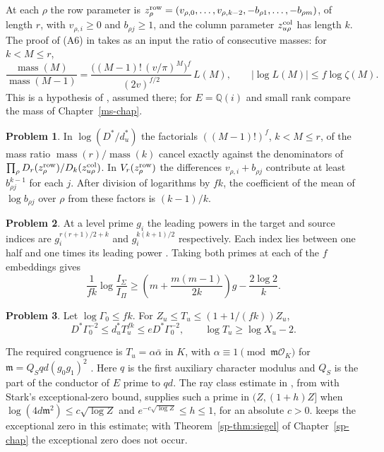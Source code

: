 \documentclass[reqno]{amsart}
\newcounter{chap}
\theoremstyle{definition}
\newtheorem{problem}{Problem}[section]
\theoremstyle{plain}
\newcommand{\mass}{\operatorname{mass}}
\newcommand{\Q}{\mathbb{Q}}
\begin{document}
At each $\rho$ the row parameter is
$z^{\rm row}_\rho=(v_{\rho,0},\dots,v_{\rho,k-2},-b_{\rho 1},\dots,-b_{\rho m})$,
of length $r$, with $v_{\rho,i}\ge0$ and $b_{\rho j}\ge1$, and the column
parameter $z^{\rm col}_{u\rho}$ has length $k$.  The proof of (A6) in
\cite[Prop.~15.25]{Adr} takes as an input the ratio of consecutive masses:
for $k<M\le r$,
\[
 \frac{\mass(M)}{\mass(M-1)}=\frac{\bigl((M-1)!\,(v/\pi)^M\bigr)^f}{(2v)^{f/2}}\,L(M),
 \qquad |\log L(M)|\le f\log\zeta(M).
\]
This is a hypothesis of \cite[Prop.~15.25]{Adr}, assumed there; for
$E=\Q(i)$ and small rank compare the mass of Chapter~\ref{ms-chap}.

\begin{problem}\label{pr:factorials}
In $\log(D^*/d_u^*)$ the factorials $((M-1)!)^f$, $k<M\le r$, of the mass
ratio $\mass(r)/\mass(k)$ cancel exactly against the denominators of
$\prod_\rho D_r(z^{\rm row}_\rho)/D_k(z^{\rm col}_{u\rho})$.  In
$V_r(z^{\rm row}_\rho)$ the differences $v_{\rho,i}+b_{\rho j}$ contribute at
least $b_{\rho j}^{k-1}$ for each $j$.  After division of logarithms by $fk$,
the coefficient of the mean of $\log b_{\rho j}$ over $\rho$ from these factors
is $(k-1)/k$.
\end{problem}

\begin{problem}\label{pr:indices}
At a level prime $g_i$ the leading powers in the target and source
indices are $g_i^{r(r+1)/2+k}$ and $g_i^{k(k+1)/2}$ respectively.
Each index lies between one half and one times its leading power
\cite[Lemma~15.21]{Adr}.  Taking both primes at each of the $f$
embeddings gives
\[
 \frac1{fk}\log\frac{I_\Sigma}{I_\Pi}
 \ge \left(m+\frac{m(m-1)}{2k}\right)g-\frac{2\log2}{k}.
\]
\end{problem}

\begin{problem}\label{pr:interval}
Let $\log\Gamma_0\le fk$.  For $Z_u\le T_u\le(1+1/(fk))Z_u$,
\[
 D^*\Gamma_0^{-2}\le d_u^* T_u^{fk}\le e D^*\Gamma_0^{-2},
 \qquad \log T_u\ge\log X_u-2 .
\]
\end{problem}

The required congruence is $T_u=\alpha\bar\alpha$ in $K$, with
$\alpha\equiv1\pmod {\mathfrak m\mathcal O_K}$ for
$\mathfrak m=Q_Sqd(g_0g_1)^2$ \cite[Rem.~15.27]{Adr}.  Here $q$ is the first
auxiliary character modulus and $Q_S$ is the part of the conductor
of $E$ prime to $qd$.  The ray class estimate in \cite[\S5.8, (C9)]{Adr}, from \cite[Thm.~1.4]{TZ} with Stark's exceptional-zero bound,
supplies such a prime in $(Z,(1+h)Z]$ when
$\log(4d\mathfrak m^2)\le c\sqrt{\log Z}$ and
$e^{-c\sqrt{\log Z}}\le h\le1$, for an absolute $c>0$.
\cite{Adr} keeps the exceptional zero in this estimate; with
Theorem~\ref{sp-thm:siegel} of Chapter~\ref{sp-chap} the exceptional
zero does not occur.
\end{document}

